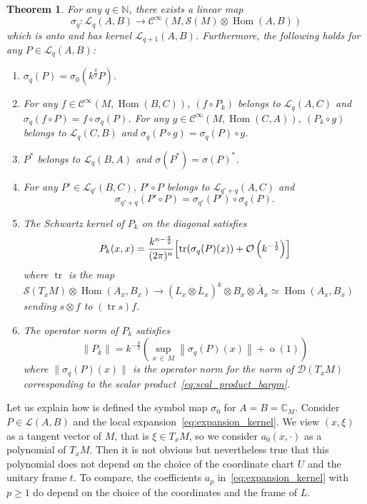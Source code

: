 \documentclass[10pt,a4paper]{article}
\newtheorem{theo}{Theorem}[section]
\theoremstyle{definition}
\numberwithin{equation}{section}
\newcommand{\N}{{\mathbb{N}}}
\newcommand{\C}{{\mathbb{C}}}
\newcommand{\si}{{\sigma}}
\newcommand{\con}{\overline}
\newcommand{\op}{\operatorname}
\newcommand{\Ci}{{\mathcal{C}}^{\infty}}
\newcommand{\bigo}{\mathcal{O}}
\newcommand{\D}{\mathcal{D}}
\newcommand{\symb}{\mathcal{S}}
\newcommand{\lag}{\mathcal{L}}
\begin{document}
\begin{theo}\label{theo:lag}
For any $q \in \N$, there exists a linear map
\[
\si_q: \lag_q (A,B) \rightarrow \Ci (M, \symb (M) \otimes \op{Hom}
(A,B))
\]
which is onto and has kernel $\lag_{q+1} (A,B)$. Furthermore, the
following holds for any $ P \in \lag_q (A,B)$:
\begin{enumerate}
\item\label{theo2.3.1} $\si _q (P) = \si_0 (k^{\frac{q}{2}} P)$.
\item\label{theo2.3.2} For any $f \in \Ci (M, \op{Hom} (B, C))$, $(f \circ P_k)$ belongs to $\lag_q (A,C)$ and $\si_q(f \circ P) = f \circ \si_q (P)$. For any $g \in \Ci (M, \op{Hom} (C, A))$, $(P_k
\circ g)$ belongs to $\lag_q (C,B)$ and $\si_q (P \circ g) = \si_q (P)
\circ g$.
\item\label{theo2.3.3} $P^* $ belongs to $\lag_q (B,A)$ and $\si (P^*) = \si (P)^*$.
\item\label{theo2.3.4} For any $P' \in \lag_{q'}(B,C)$, $P' \circ P$ belongs to $\lag_{q'+ q }(A,C)$ and
\[
\si_{q'+ q} (P' \circ P) = \si_{q'} (P') \circ \si_q (P).
\]
\item\label{theo2.3.5} The Schwartz kernel of $P_k$ on the diagonal satisfies
\[
P_k (x,x) = \frac{k^{n-\frac{q}{2}}}{ (2\pi)^n} \Bigl[\op{tr} (\si_q(P)(x))
+ \bigo \left(k^{-\frac{1}{2}}\right) \Bigr]
\]
where $\op{tr}$ is the map $\symb (T_xM) \otimes \op{Hom} (A_x,B_x) \rightarrow (L_x \otimes \con{L}_x)^k \otimes B_x \otimes
\con{A}_x \simeq \op{Hom} (A_x,B_x)$ sending $s \otimes f$ to $(\op{tr} s) f$.
\item\label{theo2.3.6}  The operator norm of $P_k$ satisfies
\[
\| P_k \| = k^{-\frac{q}{2}} \left(\sup_{x\,\in\,M} \left\|\si_q (P) (x) \right\| +
\op{o} (1) \right)
\]
where $\|\si_q (P) (x) \|$ is the operator norm for the norm of $\D (T_xM)$ corresponding to the scalar product~\eqref{eq:scal_product_bargm}. 
\end{enumerate}
\end{theo}



Let us explain how is defined the symbol map $\si_0$ for $A= B = \C_M$. Consider $P \in \lag (A,B)$ and the local expansion~\eqref{eq:expansion_kernel}. We view $(x,\xi)$ as a tangent vector of $M$, that is $
\xi \in T_xM$, so we consider $a_0 (x, \cdot)$ as a polynomial of $T_xM$. Then it is not obvious but nevertheless true that this polynomial does not depend on the choice of the coordinate chart $U$ and the unitary frame $t$. To compare, the coefficients $a_p$ in~\eqref{eq:expansion_kernel} with $p \geqslant 1$ do depend on the choice of the coordinates and the frame of $L$.
\end{document}
